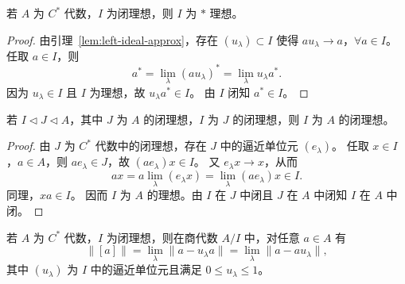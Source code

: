 \documentclass[lang=cn,a4paper,newtx,section]{elegantbook}
\begin{document}
  \begin{theorem}\label{thm:closed-ideal-star}
    若 $A$ 为 $C^*$ 代数，$I$ 为闭理想，则 $I$ 为 $*$ 理想。
  \end{theorem}

  \begin{proof}
    由引理~\ref{lem:left-ideal-approx}，存在 $(u_\lambda)\subset I$ 使得 $au_\lambda\to a$，$\forall a\in I$。
    任取 $a\in I$，则
    \begin{equation*}
      a^*=\lim_{\lambda}(au_\lambda)^*=\lim_{\lambda}u_\lambda a^*.
    \end{equation*}
    因为 $u_\lambda\in I$ 且 $I$ 为理想，故 $u_\lambda a^*\in I$。
    由 $I$ 闭知 $a^*\in I$。
  \end{proof}

  \begin{remark}
    若 $I\triangleleft J\triangleleft A$，其中 $J$ 为 $A$ 的闭理想，$I$ 为 $J$ 的闭理想，则 $I$ 为 $A$ 的闭理想。
  \end{remark}

  \begin{proof}
    由 $J$ 为 $C^*$ 代数中的闭理想，存在 $J$ 中的逼近单位元 $(e_\lambda)$。
    任取 $x\in I$，$a\in A$，则 $ae_\lambda\in J$，故 $(ae_\lambda)x\in I$。
    又 $e_\lambda x\to x$，从而
    \begin{equation*}
      ax=a\lim_{\lambda}(e_\lambda x)=\lim_{\lambda}(ae_\lambda)x\in I.
    \end{equation*}
    同理，$xa\in I$。
    因而 $I$ 为 $A$ 的理想。由 $I$ 在 $J$ 中闭且 $J$ 在 $A$ 中闭知 $I$ 在 $A$ 中闭。
  \end{proof}

  \begin{lemma}\label{lem:quotient-norm}
    若 $A$ 为 $C^*$ 代数，$I$ 为闭理想，则在商代数 $A/I$ 中，对任意 $a\in A$ 有
    \[
      \|[a]\|=\lim_{\lambda}\|a-u_\lambda a\|=\lim_{\lambda}\|a-au_\lambda\|,
    \]
    其中 $(u_\lambda)$ 为 $I$ 中的逼近单位元且满足 $0\le u_\lambda\le 1$。
  \end{lemma}
\end{document}
